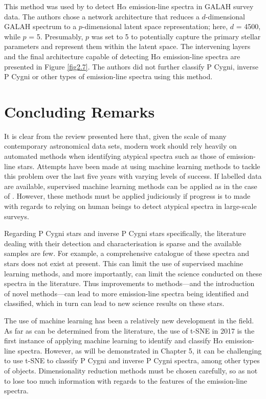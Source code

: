 This method was used by \citet{vcotar2021galah} to detect H$\alpha$ emission-line spectra in GALAH survey data. The authors chose a network architecture that reduces a $d$-dimensional GALAH spectrum to a $p$-dimensional latent space representation; here, $d$ = 4500, while $p$ = 5. Presumably, $p$ was set to 5 to potentially capture the primary stellar parameters and represent them within the latent space. The intervening layers and the final architecture capable of detecting H$\alpha$ emission-line spectra are presented in Figure \ref{fig2.7}. The authors did not further classify P Cygni, inverse P Cygni or other types of emission-line spectra using this method. 

\section{Concluding Remarks}

It is clear from the review presented here that, given the scale of many contemporary astronomical data sets, modern work should rely heavily on automated methods when identifying atypical spectra such as those of emission-line stars. Attempts have been made at using machine learning methods to tackle this problem over the last five years with varying levels of success. If labelled data are available, supervised machine learning methods can be applied as in the case of \citet{zhang2021catalog}. However, these methods must be applied judiciously if progress is to made with regards to relying on human beings to detect atypical spectra in large-scale surveys.

Regarding P Cygni stars and inverse P Cygni stars specifically, the literature dealing with their detection and characterisation is sparse and the available samples are few. For example, a comprehensive catalogue of these spectra and stars does not exist at present. This can limit the use of supervised machine learning methods, and more importantly, can limit the science conducted on these spectra in the literature. Thus improvements to methods—and the introduction of novel methods—can lead to more emission-line spectra being identified and classified, which in turn can lead to new science results on these stars. 

The use of machine learning has been a relatively new development in the field. As far as can be determined from the literature, the use of t-SNE in 2017 is the first instance of applying machine learning to identify and classify H$\alpha$ emission-line spectra. However, as will be demonstrated in Chapter 5, it can be challenging to use t-SNE to classify P Cygni and inverse P Cygni spectra, among other types of objects. Dimensionality reduction methods must be chosen carefully, so as not to lose too much information with regards to the features of the emission-line spectra.

